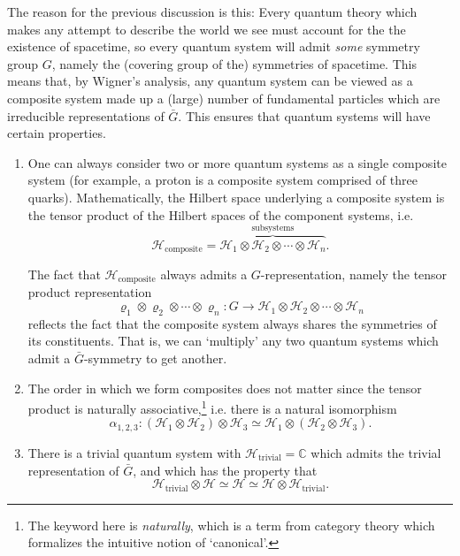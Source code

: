 \documentclass[a4paper,10pt]{scrreprt}
\newcommand{\C}{\mathbb{C}}
\theoremstyle{definition}
\theoremstyle{plain}
\theoremstyle{remark}
\begin{document}
The reason for the previous discussion is this: Every quantum theory which makes any attempt to describe the world we see must account for the the existence of spacetime, so every quantum system will admit \emph{some} symmetry group $G$, namely the (covering group of the) symmetries of spacetime. This means that, by Wigner's analysis, any quantum system can be viewed as a composite system made up a (large) number of fundamental particles which are irreducible representations of $\bar{G}$. This ensures that quantum systems will have certain properties. 
\begin{enumerate}
  \item One can always consider two or more quantum systems as a single composite system (for example, a proton is a composite system comprised of three quarks). Mathematically, the Hilbert space underlying a composite system is the tensor product of the Hilbert spaces of the component systems, i.e. 
    \begin{equation*}
      \mathscr{H}_{\text{composite}} = \overbrace{\mathscr{H}_{1} \otimes \mathscr{H}_{2} \otimes \cdots \otimes \mathscr{H}_{n}}^{\text{subsystems}}.
    \end{equation*}

    The fact that $\mathscr{H}_{\text{composite}}$ always admits a $G$-representation, namely the tensor product representation
    \begin{equation*}
      \varrho_{1} \otimes \varrho_{2} \otimes \cdots \otimes \varrho_{n} \colon G \to \mathscr{H}_{1} \otimes \mathscr{H}_{2} \otimes \cdots \otimes \mathscr{H}_{n}
    \end{equation*}
    reflects the fact that the composite system always shares the symmetries of its constituents. That is, we can `multiply' any two quantum systems which admit a $\bar{G}$-symmetry to get another. 

  \item The order in which we form composites does not matter since the tensor product is naturally associative,\footnote{The keyword here is \emph{naturally}, which is a term from category theory which formalizes the intuitive notion of `canonical'.} i.e. there is a natural isomorphism
    \begin{equation*}
      \alpha_{1,2,3}\colon (\mathscr{H}_{1} \otimes \mathscr{H}_{2}) \otimes \mathscr{H}_{3} \simeq \mathscr{H}_{1} \otimes (\mathscr{H}_{2} \otimes \mathscr{H}_{3}).
    \end{equation*}

  \item There is a trivial quantum system with $\mathscr{H}_{\text{trivial}} = \C$ which admits the trivial representation of $\bar{G}$, and which has the property that
    \begin{equation*}
      \mathscr{H}_{\text{trivial}} \otimes \mathscr{H} \simeq \mathscr{H} \simeq \mathscr{H} \otimes \mathscr{H}_{\text{trivial}}.
    \end{equation*}
\end{enumerate}
\end{document}
